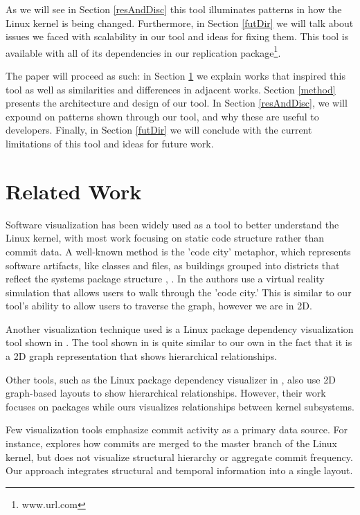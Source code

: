 \documentclass[conference]{IEEEtran}
\begin{document}

As we will see in Section \ref{resAndDisc} this tool illuminates patterns in how the Linux kernel is being changed. Furthermore, in Section \ref{futDir} we will talk about issues we faced with scalability in our tool and ideas for fixing them. This tool is available with all of its dependencies in our replication package\footnote{www.url.com}.

The paper will proceed as such: in Section \ref{relWork} we explain works that inspired this tool as well as similarities and differences in adjacent works. Section \ref{method} presents the architecture and design of our tool. In Section \ref{resAndDisc}, we will expound on patterns shown through our tool, and why these are useful to developers. Finally, in Section \ref{futDir} we will conclude with the current limitations of this tool and ideas for future work.




\section{Related Work}
\label{relWork}


Software visualization has been widely used as a tool to better understand the Linux kernel, with most work focusing on static code structure rather than commit data. A well-known method is the 'code city' metaphor, which represents software artifacts, like classes and files, as buildings grouped into districts that reflect the systems package structure \cite{cityVR}, \cite{city}. In \cite{cityVR} the authors use a virtual reality simulation that allows users to walk through the 'code city.' This is similar to our tool's ability to allow users to traverse the graph, however we are in 2D. 

Another visualization technique used is a Linux package dependency visualization tool shown in \cite{mithun}. The tool shown in \cite{mithun} is quite similar to our own in the fact that it is a 2D graph representation that shows hierarchical relationships.

Other tools, such as the Linux package dependency visualizer in \cite{mithun}, also use 2D graph-based layouts to show hierarchical relationships. However, their work focuses on packages while ours visualizes relationships between kernel subsystems. 

Few visualization tools emphasize commit activity as a primary data source. For instance, \cite{merge} explores how commits are merged to the master branch of the Linux kernel, but does not visualize structural hierarchy or aggregate commit frequency. Our approach integrates structural and temporal information into a single layout.
\end{document}
